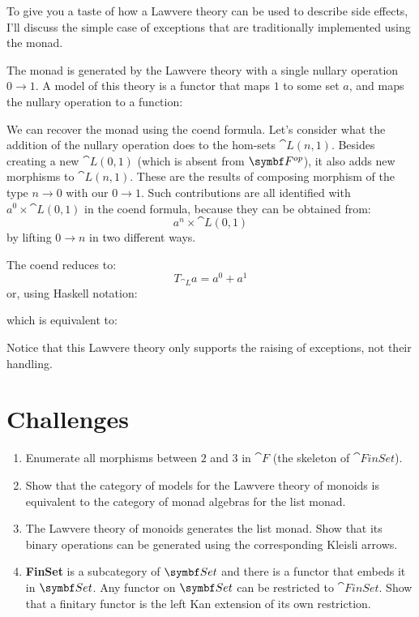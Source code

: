 To give you a taste of how a Lawvere theory can be used to describe side
effects, I'll discuss the simple case of exceptions that are
traditionally implemented using the  monad.

The  monad is generated by the Lawvere theory with a
single nullary operation $0 \to 1$. A model of this
theory is a functor that maps $1$ to some set $a$, and
maps the nullary operation to a function:

We can recover the  monad using the coend formula. Let's
consider what the addition of the nullary operation does to the hom-sets
$\cat{L}(n, 1)$. Besides creating a new $\cat{L}(0, 1)$ (which is
absent from $\Fop$), it also adds new morphisms
to $\cat{L}(n, 1)$. These are the results of composing morphism of the
type $n \to 0$ with our $0 \to 1$.
Such contributions are all identified with $a^0 \times \cat{L}(0, 1)$ in
the coend formula, because they can be obtained from:
\[a^n \times \cat{L}(0, 1)\]
by lifting $0 \to n$ in two different ways.

\begin{figure}[H]
  \centering
\end{figure}

\noindent
The coend reduces to:
\[T_{\cat{L}} a = a^0 + a^1\]
or, using Haskell notation:

which is equivalent to:

Notice that this Lawvere theory only supports the raising of exceptions,
not their handling.

\section{Challenges}

\begin{enumerate}
  \tightlist
  \item
        Enumerate all morphisms between $2$ and $3$ in $\cat{F}$ (the skeleton of
        $\cat{FinSet}$).
  \item
        Show that the category of models for the Lawvere theory of monoids is
        equivalent to the category of monad algebras for the list monad.
  \item
        The Lawvere theory of monoids generates the list monad. Show that its
        binary operations can be generated using the corresponding Kleisli
        arrows.
  \item
        \textbf{FinSet} is a subcategory of $\Set$ and there is a
        functor that embeds it in $\Set$. Any functor on $\Set$
        can be restricted to $\cat{FinSet}$. Show that a finitary functor is
        the left Kan extension of its own restriction.
\end{enumerate}

